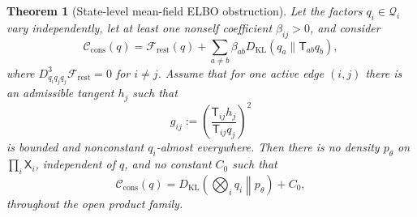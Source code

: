 \documentclass[11pt]{article}
\newtheorem{theorem}{Theorem}
\begin{document}
\begin{theorem}[State-level mean-field ELBO obstruction]
\label{thm:state_level_elbo_nogo}
Let the factors $q_i\in\mathcal{Q}_i$ vary independently, let at least one nonself coefficient $\beta_{ij}>0$, and consider
\begin{equation}
\mathcal{C}_{\mathrm{cons}}(q)
=\mathcal{F}_{\mathrm{rest}}(q)
+\sum_{a\ne b}\beta_{ab}D_{\mathrm{KL}}(q_a\|\mathsf{T}_{ab}q_b),
\label{eq:population_consensus_nogo_functional}
\end{equation}
where $D^3_{q_iq_jq_j}\mathcal{F}_{\mathrm{rest}}=0$ for $i\ne j$. Assume that for one active edge $(i,j)$ there is an admissible tangent $h_j$ such that
\begin{equation}
g_{ij}:=\left(\frac{\mathsf{T}_{ij}h_j}{\mathsf{T}_{ij}q_j}\right)^2
\label{eq:nogo_nondegenerate_tangent}
\end{equation}
is bounded and nonconstant $q_i$-almost everywhere. Then there is no density $p_\theta$ on $\prod_i\mathsf{X}_i$, independent of $q$, and no constant $C_0$ such that
\begin{equation}
\mathcal{C}_{\mathrm{cons}}(q)
=D_{\mathrm{KL}}\left(\bigotimes_iq_i\middle\|p_\theta\right)+C_0,
\label{eq:state_level_elbo_representation_impossible}
\end{equation}
throughout the open product family.
\end{theorem}
\end{document}

